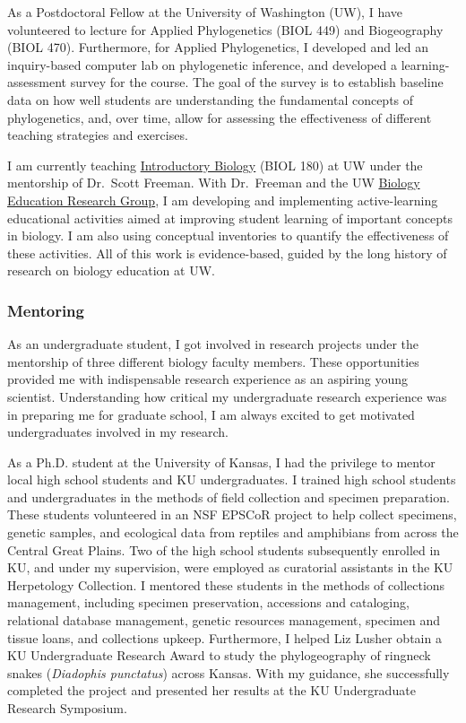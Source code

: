 As a Postdoctoral Fellow at the University of Washington (UW), I have
volunteered to lecture for Applied Phylogenetics (BIOL 449) and Biogeography
(BIOL 470).
Furthermore, for Applied Phylogenetics, I developed and led an inquiry-based
computer lab on phylogenetic inference, and developed a learning-assessment
survey for the course.
The goal of the survey is to establish baseline data on how well students are
understanding the fundamental concepts of phylogenetics, and, over time, allow
for assessing the effectiveness of different teaching strategies and exercises.

I am currently teaching
\href{http://courses.biology.washington.edu/biol180/}{Introductory Biology}
(BIOL 180) at UW under the mentorship of Dr.\ Scott Freeman.
With Dr.\ Freeman and the UW
\href{https://sites.google.com/site/uwbioedresgroup/home}{Biology Education
    Research Group}, I am developing and implementing active-learning
educational activities aimed at improving student learning of important
concepts in biology.
I am also using conceptual inventories to quantify the effectiveness of these
activities.
All of this work is evidence-based, guided by the long history of research on
biology education at UW.

\subsubsection*{Mentoring}
As an undergraduate student, I got involved in research projects under the
mentorship of three different biology faculty members.
These opportunities provided me with indispensable research experience as an
aspiring young scientist.
Understanding how critical my undergraduate research experience was in
preparing me for graduate school, I am always excited to get motivated
undergraduates involved in my research.

As a Ph.D. student at the University of Kansas, I had the privilege to mentor
local high school students and KU undergraduates.
I trained high school students and undergraduates in the methods of field
collection and specimen preparation.
These students volunteered in an NSF EPSCoR project to help collect specimens,
genetic samples, and ecological data from reptiles and amphibians from across
the Central Great Plains.
Two of the high school students subsequently enrolled in KU, and under my
supervision, were employed as curatorial assistants in the KU Herpetology
Collection.
I mentored these students in the methods of collections management, including
specimen preservation, accessions and cataloging, relational database
management, genetic resources management, specimen and tissue loans, and
collections upkeep.
Furthermore, I helped Liz Lusher obtain a KU Undergraduate Research Award to
study the phylogeography of ringneck snakes (\emph{Diadophis punctatus}) across
Kansas.
With my guidance, she successfully completed the project and presented her
results at the KU Undergraduate Research Symposium.

